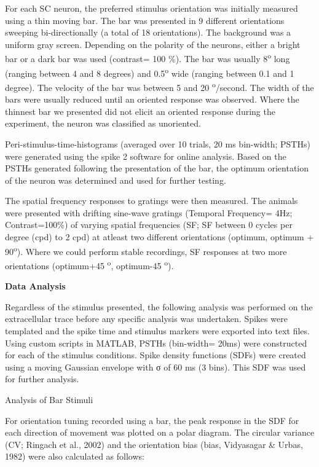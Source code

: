 For each SC neuron, the preferred stimulus orientation was initially
measured using a thin moving bar. The bar was presented in 9 different
orientations sweeping bi-directionally (a total of 18 orientations). The
background was a uniform gray screen. Depending on the polarity of the
neurons, either a bright bar or a dark bar was used (contrast= 100 \%).
The bar was usually 8\textsuperscript{o} long (ranging between 4 and 8
degrees) and 0.5\textsuperscript{o} wide (ranging between 0.1 and 1
degree). The velocity of the bar was between 5 and 20
\textsuperscript{o}/second. The width of the bars were usually reduced
until an oriented response was observed. Where the thinnest bar we
presented did not elicit an oriented response during the experiment, the
neuron was classified as unoriented.

Peri-stimulus-time-histograms (averaged over 10 trials, 20 ms bin-width;
PSTHs) were generated using the spike 2 software for online analysis.
Based on the PSTHs generated following the presentation of the bar, the
optimum orientation of the neuron was determined and used for further
testing.

The spatial frequency responses to gratings were then measured. The
animals were presented with drifting sine-wave gratings (Temporal
Frequency= 4Hz; Contrast=100\%) of varying spatial frequencies (SF; SF
between 0 cycles per degree (cpd) to 2 cpd) at atleast two different
orientations (optimum, optimum + 90\textsuperscript{o}). Where we could
perform stable recordings, SF responses at two more orientations
(optimum+45 \textsuperscript{o}, optimum-45 \textsuperscript{o}).

\textbf{Data Analysis}

Regardless of the stimulus presented, the following analysis was
performed on the extracellular trace before any specific analysis was
undertaken. Spikes were templated and the spike time and stimulus
markers were exported into text files. Using custom scripts in MATLAB,
PSTHs (bin-width= 20ms) were constructed for each of the stimulus
conditions. Spike density functions (SDFs) were created using a moving
Gaussian envelope with σ of 60 ms (3 bins). This SDF was used for
further analysis.

{Analysis of Bar Stimuli}

For orientation tuning recorded using a bar, the peak response in the
SDF for each direction of movement was plotted on a polar diagram. The
circular variance (CV; Ringach et al., 2002) and the orientation bias
(bias, Vidyasagar \& Urbas, 1982) were also calculated as follows:


